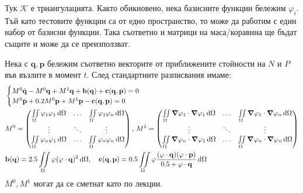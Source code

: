 \documentclass[bulgarian, 12pt]{article}
\begin{document}
\begin{large}
Тук $\mathcal{K}$ е триангулацията. 
Както обикновено, нека базисните функции бележим $\varphi_i$. 
Тъй като тестовите функции са от едно пространство, то може да работим с един набор от базисни функции.
Така съответно и матрици на маса/коравина ще бъдат същите и може да се преизползват.

Нека с $\mathbf{q}, \mathbf{p}$ бележим съответно векторите от приближените стойности на $N$ и $P$ във възлите в момент $t$.
След стандартните разписвания имаме: 
\begin{align*}
  &\begin{cases}
	  M^0\dot{\mathbf{q}} - M^0\mathbf{q} + M^1\mathbf{q} + \mathbf{b}(\mathbf{q}) + \mathbf{c}(\mathbf{q},\mathbf{p}) = 0 \\
    M^0\dot{\mathbf{p}} + 0.2 M^0\mathbf{p} + M^1\mathbf{p} - \mathbf{c}(\mathbf{q},\mathbf{p}) = 0 \\
	\end{cases} \\
  &M^0=\begin{pmatrix}
	\iint\limits_{\Omega} \varphi_1 \varphi_1 \,\dd\Omega & \hdots & \iint\limits_{\Omega} \varphi_1 \varphi_n \,\dd\Omega \\
	\vdots & \ddots & \vdots \\
	\iint\limits_{\Omega} \varphi_n \varphi_1 \,\dd\Omega & \hdots & \iint\limits_{\Omega} \varphi_n \varphi_n \,\dd\Omega \\
	\end{pmatrix},\,
  M^1=\begin{pmatrix}
	\iint\limits_{\Omega} \grad \varphi_1 \cdot \grad \varphi_1 \,\dd\Omega & \hdots & \iint\limits_{\Omega} \grad \varphi_1 \cdot \grad \varphi_n \,\dd\Omega \\
	\vdots & \ddots & \vdots \\
	\iint\limits_{\Omega} \grad \varphi_n \cdot \grad \varphi_1 \,\dd\Omega & \hdots & \iint\limits_{\Omega} \grad \varphi_n \cdot \grad \varphi_n \,\dd\Omega \\
	\end{pmatrix}\\
  &\mathbf{b}(\mathbf{q}) = 2.5 \iint\limits_{\Omega} \mathbf{\varphi} (\mathbf{\varphi} \cdot \mathbf{q})^2\,\dd\Omega ,\quad
  \mathbf{c}(\mathbf{q},\mathbf{p}) = 0.5 \iint\limits_{\Omega} \mathbf{\varphi} \frac{(\mathbf{\varphi} \cdot \mathbf{q})(\mathbf{\varphi} \cdot \mathbf{p})}{0.5 + \mathbf{\varphi} \cdot \mathbf{q}} \,\dd\Omega
\end{align*}
$M^0, M^1$ могат да се сметнат като по лекции. 


\end{large}
\end{document}
